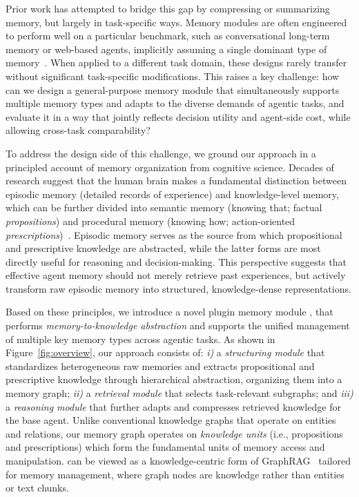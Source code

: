 Prior work has attempted to bridge this gap by compressing or summarizing memory, but largely in task-specific ways. Memory modules are often engineered to perform well on a particular benchmark, such as conversational long-term memory or web-based agents, implicitly assuming a single dominant type of memory~\citep{wang2024agentworkflowmemory,gutiérrez2025ragmemorynonparametriccontinual}. When applied to a different task domain, these designs rarely transfer without significant task-specific modifications. This raises a key challenge: how can we design a general-purpose memory module that simultaneously supports multiple memory types and adapts to the diverse demands of agentic tasks, and evaluate it in a way that jointly reflects decision utility and agent-side cost, while allowing cross-task comparability?

To address the design side of this challenge, we ground our approach in a principled account of memory organization from cognitive science. Decades of research suggest that the human brain makes a fundamental distinction between episodic memory (detailed records of experience) and knowledge-level memory, which can be further divided into semantic memory (knowing that; factual \textit{propositions}) and procedural memory (knowing how; action-oriented \textit{prescriptions})~\citep{Tulving1972EpisodicSemantic, Squire2004MemorySystems}. Episodic memory serves as the source from which propositional and prescriptive knowledge are abstracted, while the latter forms are most directly useful for reasoning and decision-making. This perspective suggests that effective agent memory should not merely retrieve past experiences, but actively transform raw episodic memory into structured, knowledge-dense representations.

Based on these principles, we introduce a novel plugin memory module \plugmem, that performs \textit{memory-to-knowledge abstraction} and supports the unified management of multiple key memory types across agentic tasks. As shown in Figure~\ref{fig:overview}, our approach consists of: \textit{i)} a \textit{structuring module} that standardizes heterogeneous raw memories and extracts propositional and prescriptive knowledge through hierarchical abstraction, organizing them into a memory graph; \textit{ii)} a \textit{retrieval module} that selects task-relevant subgraphs; and \textit{iii)} a \textit{reasoning module} that further adapts and compresses retrieved knowledge for the base agent. Unlike conventional knowledge graphs that operate on entities and relations, our memory graph operates on \textit{knowledge units} (i.e., propositions and prescriptions) which form the fundamental units of memory access and manipulation. \plugmem can be viewed as a knowledge-centric form of GraphRAG~\citep{edge2025localglobalgraphrag} tailored for memory management, where graph nodes are knowledge rather than entities or text chunks.

